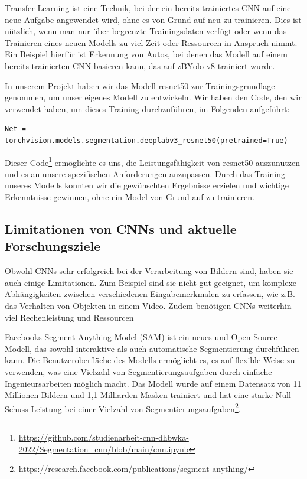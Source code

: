         Transfer Learning ist eine Technik, bei der ein bereits trainiertes CNN auf eine neue Aufgabe angewendet wird, ohne es von Grund auf neu zu trainieren.      
        Dies ist nützlich, wenn man nur über begrenzte Trainingsdaten verfügt oder wenn das Trainieren eines neuen Modells zu viel Zeit oder Ressourcen in Anspruch nimmt.      
        Ein Beispiel hierfür ist Erkennung von Autos, bei denen das Modell auf einem bereits trainierten CNN basieren kann, das auf z\.B\. Yolo v8 trainiert wurde.

        In unserem Projekt haben wir das Modell resnet50 zur Trainingsgrundlage genommen, um unser eigenes Modell zu entwickeln. Wir haben den Code, den wir verwendet haben, um dieses Training durchzuführen, im Folgenden aufgeführt:

        \begin{lstlisting}
Net = torchvision.models.segmentation.deeplabv3_resnet50(pretrained=True)
        \end{lstlisting}

        Dieser Code\footnote{\url{https://github.com/studienarbeit-cnn-dhbwka-2022/Segmentation_cnn/blob/main/cnn.ipynb}} ermöglichte es uns, die Leistungsfähigkeit von resnet50 auszunutzen und es an unsere spezifischen Anforderungen anzupassen. Durch das Training unseres Modells konnten wir die gewünschten Ergebnisse erzielen und wichtige Erkenntnisse gewinnen, ohne ein Model von Grund auf zu trainieren.
        
    \subsection{Limitationen von CNNs und aktuelle Forschungsziele}

        Obwohl CNNs sehr erfolgreich bei der Verarbeitung von Bildern sind, haben sie auch einige Limitationen.      
        Zum Beispiel sind sie nicht gut geeignet, um komplexe Abhängigkeiten zwischen verschiedenen Eingabemerkmalen zu erfassen, wie z.B. das Verhalten von Objekten in einem Video.
        Zudem benötigen CNNs weiterhin viel Rechenleistung und Ressourcen

        Facebooks Segment Anything Model (SAM) ist ein neues und Open-Source Modell, das sowohl interaktive als auch automatische Segmentierung durchführen kann.
        Die Benutzeroberfläche des Modells ermöglicht es, es auf flexible Weise zu verwenden, was eine Vielzahl von Segmentierungsaufgaben durch einfache Ingenieursarbeiten möglich macht.
        Das Modell wurde auf einem Datensatz von 11 Millionen Bildern und 1,1 Milliarden Masken trainiert und hat eine starke Null-Schuss-Leistung bei einer Vielzahl von Segmentierungsaufgaben\footnote{\url{https://research.facebook.com/publications/segment-anything/}}.

